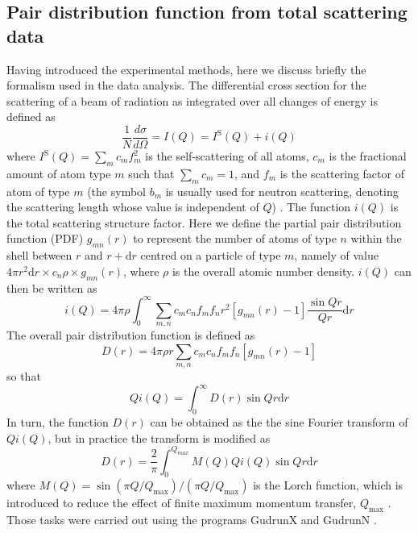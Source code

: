 \documentclass[twoside,twocolumn,9pt]{article}
\begin{document}
\subsection{Pair distribution function from total scattering data}
Having introduced the experimental methods, here we discuss briefly the formalism used in the data analysis. 
The differential cross section for the scattering of a beam of radiation as integrated over all changes of energy is defined as
\begin{equation}
\frac{1}{N}\frac{d\sigma}{d\Omega}=I(Q)=I^\mathrm{S}(Q)+i(Q)
\end{equation}
where $I^\mathrm{S}(Q)=  \sum_m c_m f_m^2 $ is the self-scattering of all atoms, $c_m$ is the fractional amount of atom type $m$ such that $\sum_m c_m = 1$, and $f_m$ is the scattering factor of atom of type $m$ (the symbol $b_m$ is usually used for neutron scattering, denoting the scattering length whose value is independent of $Q$) \cite{Keen:2001wc}. The function $i(Q)$ is the total scattering structure factor. Here we define the partial pair distribution function (PDF) $g_{mn}(r)$ to represent the number of atoms of type $n$ within the shell between $r$ and  $r+\mathrm{d}r$ centred on a particle of type $m$, namely of value $4 \pi r^2 \mathrm{d}r \times c_n \rho \times g_{mn}(r)$,  where $\rho$ is the overall atomic number density. 
$i(Q)$ can then be written as \cite{Dove2002}
\begin{equation} \label{eq:iQ}
i(Q)=4\pi\rho\int^{\infty}_{0}\sum_{m,n}c_m c_n f_m f_n r^2 [g_{mn}(r)-1]\frac{\sin{Qr}}{Qr} \mathrm{d}r
\end{equation}
 The overall pair distribution function is defined as
\begin{equation}\label{eq:Dr}
D(r)=4\pi\rho r \sum_{m,n}c_m c_n f_m f_n [g_{mn}(r)-1]
\end{equation}
so that
\begin{equation}
Qi(Q)=\int^{\infty}_{0} D(r) \sin{Qr} \mathrm{d}r
\end{equation}
In turn, the function $D(r)$ can be obtained as the the sine Fourier transform of $Qi(Q)$, but in practice the transform is modified as
\begin{equation}\label{eq:Dr2}
D(r)=\frac{2}{\pi}\int^{Q_{max}}_{0} M(Q)Qi(Q)\sin{Qr} \mathrm{d}r
\end{equation}
where $M(Q) = \sin(\pi Q/Q_\mathrm{max})/(\pi Q/Q_\mathrm{max})$ is the Lorch function, which is introduced to reduce the effect of finite maximum momentum transfer, $Q_\mathrm{max}$ \cite{Lorch:1969js, Dove2002, Soper:2012kr}. Those tasks were carried out using the programs GudrunX and GudrunN \cite{Soper:2011fda,Soper:2012vs}.
\end{document}
